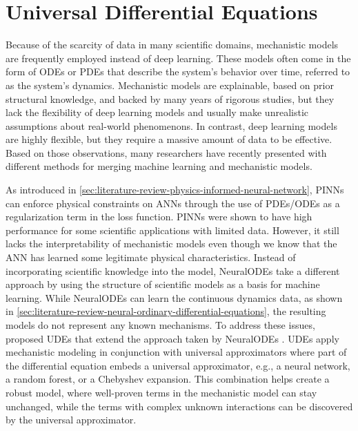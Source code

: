 \section{Universal Differential Equations}

Because of the scarcity of data in many scientific domains, mechanistic models are frequently employed instead of deep learning.
These models often come in the form of \glspl{ODE} or \glspl{PDE} that describe the system's behavior over time, referred to as the system's dynamics.
Mechanistic models are explainable, based on prior structural knowledge, and backed by many years of rigorous studies, but they lack the flexibility of deep learning models and usually make unrealistic assumptions about real-world phenomenons.
In contrast, deep learning models are highly flexible, but they require a massive amount of data to be effective.
Based on those observations, many researchers have recently presented with different methods for merging machine learning and mechanistic models.

As introduced in \autoref{sec:literature-review-physics-informed-neural-network}, \glspl{PINN} can enforce physical constraints on \glspl{ANN} through the use of \glspl{PDE}/\glspl{ODE} as a regularization term in the loss function.
\glspl{PINN} were shown to have high performance for some scientific applications with limited data.
However, it still lacks the interpretability of  mechanistic models even though we know that the \gls{ANN} has learned some legitimate physical characteristics.
Instead of incorporating scientific knowledge into the model, \glspl{NeuralODE} take a different approach by using the structure of scientific models as a basis for machine learning.
While \glspl{NeuralODE} can learn the continuous dynamics data, as shown in \autoref{sec:literature-review-neural-ordinary-differential-equations}, the resulting models do not represent any known mechanisms.
To address these issues, \citeauthor{rackauckasUniversalDifferentialEquations2020} proposed \glspl{UDE} that extend the approach taken by \glspl{NeuralODE} \cite{rackauckasUniversalDifferentialEquations2020}.
\glspl{UDE} apply mechanistic modeling in conjunction with universal approximators where part of the differential equation embeds a universal approximator, e.g., a neural network, a random forest, or a Chebyshev expansion.
This combination helps create a robust model, where well-proven terms in the mechanistic model can stay unchanged, while the terms with complex unknown interactions can be discovered by the universal approximator.

